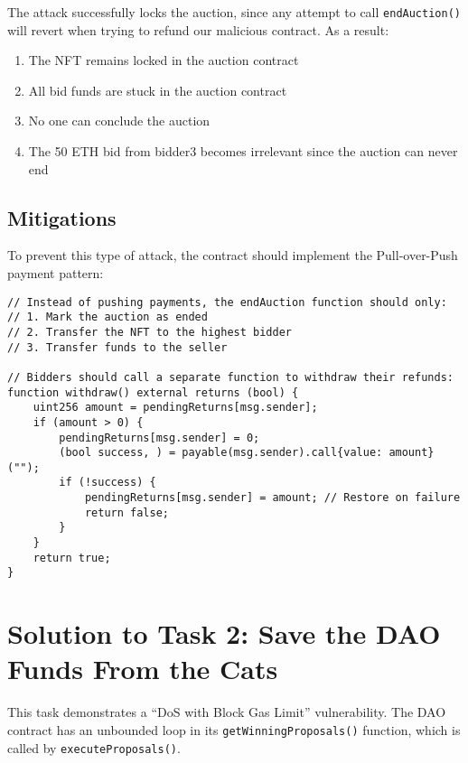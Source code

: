 \documentclass[12pt]{article}
\begin{document}
The attack successfully locks the auction, since any attempt to call \texttt{endAuction()} will revert when trying to refund our malicious contract. As a result:

\begin{enumerate}
\item The NFT remains locked in the auction contract
\item All bid funds are stuck in the auction contract
\item No one can conclude the auction
\item The 50 ETH bid from bidder3 becomes irrelevant since the auction can never end
\end{enumerate}

\subsection*{Mitigations}

To prevent this type of attack, the contract should implement the Pull-over-Push payment pattern:

\noindent
\begin{minipage}{\textwidth}
\begin{lstlisting}[language=Solidity]
// Instead of pushing payments, the endAuction function should only:
// 1. Mark the auction as ended
// 2. Transfer the NFT to the highest bidder
// 3. Transfer funds to the seller

// Bidders should call a separate function to withdraw their refunds:
function withdraw() external returns (bool) {
    uint256 amount = pendingReturns[msg.sender];
    if (amount > 0) {
        pendingReturns[msg.sender] = 0;
        (bool success, ) = payable(msg.sender).call{value: amount}("");
        if (!success) {
            pendingReturns[msg.sender] = amount; // Restore on failure
            return false;
        }
    }
    return true;
}
\end{lstlisting}
\end{minipage}

\section*{Solution to Task 2: Save the DAO Funds From the Cats}

This task demonstrates a ``DoS with Block Gas Limit'' vulnerability. The DAO contract has an unbounded loop in its \texttt{getWinningProposals()} function, which is called by \texttt{executeProposals()}.
\end{document}
